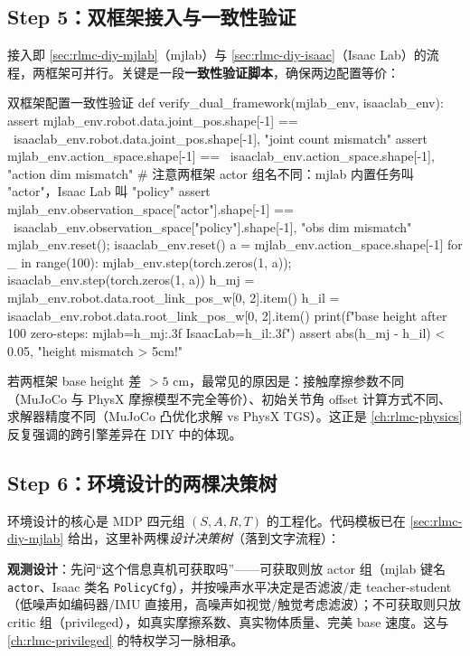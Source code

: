 \subsection{Step 5：双框架接入与一致性验证}
\label{sec:rlmc-diy-pipe-dual}

接入即 \cref{sec:rlmc-diy-mjlab}（mjlab）与 \cref{sec:rlmc-diy-isaac}（Isaac Lab）的流程，两框架可并行。关键是一段\textbf{一致性验证脚本}，确保两边配置等价：

\begin{codebox}[Python]{双框架配置一致性验证}
def verify_dual_framework(mjlab_env, isaaclab_env):
    assert mjlab_env.robot.data.joint_pos.shape[-1] == \
           isaaclab_env.robot.data.joint_pos.shape[-1], "joint count mismatch"
    assert mjlab_env.action_space.shape[-1] == \
           isaaclab_env.action_space.shape[-1], "action dim mismatch"
    # 注意两框架 actor 组名不同：mjlab 内置任务叫 "actor"，Isaac Lab 叫 "policy"
    assert mjlab_env.observation_space["actor"].shape[-1] == \
           isaaclab_env.observation_space["policy"].shape[-1], "obs dim mismatch"
    mjlab_env.reset(); isaaclab_env.reset()
    a = mjlab_env.action_space.shape[-1]
    for _ in range(100):
        mjlab_env.step(torch.zeros(1, a)); isaaclab_env.step(torch.zeros(1, a))
    h_mj = mjlab_env.robot.data.root_link_pos_w[0, 2].item()
    h_il = isaaclab_env.robot.data.root_link_pos_w[0, 2].item()
    print(f"base height after 100 zero-steps: mjlab={h_mj:.3f} IsaacLab={h_il:.3f}")
    assert abs(h_mj - h_il) < 0.05, "height mismatch > 5cm!"
\end{codebox}

若两框架 base height 差 $>5$ cm，最常见的原因是：接触摩擦参数不同（MuJoCo 与 PhysX 摩擦模型不完全等价）、初始关节角 offset 计算方式不同、求解器精度不同（MuJoCo 凸优化求解 vs PhysX TGS）。这正是 \cref{ch:rlmc-physics} 反复强调的跨引擎差异在 DIY 中的体现。

\subsection{Step 6：环境设计的两棵决策树}
\label{sec:rlmc-diy-pipe-design}

环境设计的核心是 MDP 四元组 $(S,A,R,T)$ 的工程化。代码模板已在 \cref{sec:rlmc-diy-mjlab} 给出，这里补两棵\emph{设计决策树}（落到文字流程）：

\textbf{观测设计}：先问“这个信息真机可获取吗”——可获取则放 actor 组（mjlab 键名 \texttt{actor}、Isaac 类名 \texttt{PolicyCfg}），并按噪声水平决定是否滤波/走 teacher-student（低噪声如编码器/IMU 直接用，高噪声如视觉/触觉考虑滤波）；不可获取则只放 critic 组（privileged），如真实摩擦系数、真实物体质量、完美 base 速度。这与 \cref{ch:rlmc-privileged} 的特权学习一脉相承。

